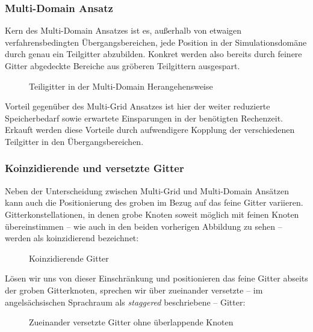 \subsubsection{Multi-Domain Ansatz}

Kern des Multi-Domain Ansatzes ist es, außerhalb von etwaigen verfahrensbedingten Übergangsbereichen, jede Position in der Simulationsdomäne durch genau ein Teilgitter abzubilden. Konkret werden also bereits durch feinere Gitter abgedeckte Bereiche aus gröberen Teilgittern ausgespart.

\begin{figure}[h]
\centering

\caption{Teiligitter in der Multi-Domain Herangehensweise}
\end{figure}

\noindent
Vorteil gegenüber des Multi-Grid Ansatzes ist hier der weiter reduzierte Speicherbedarf sowie erwartete Einsparungen in der benötigten Rechenzeit. Erkauft werden diese Vorteile durch aufwendigere Kopplung \cite[Kap.~3.1]{Lagrava12} der verschiedenen Teilgitter in den Übergangsbereichen.

\subsubsection{Koinzidierende und versetzte Gitter}

Neben der Unterscheidung zwischen Multi-Grid und Multi-Domain Ansätzen kann auch die Positionierung des groben im Bezug auf das feine Gitter variieren. Gitterkonstellationen, in denen grobe Knoten soweit möglich mit feinen Knoten übereinstimmen -- wie auch in den beiden vorherigen Abbildung zu sehen -- werden als koinzidierend bezeichnet:

\begin{figure}[h]
\centering

\caption{Koinzidierende Gitter}
\label{fig:CoincidingGrid}
\end{figure}

\noindent
Lösen wir uns von dieser Einschränkung und positionieren das feine Gitter abseits der groben Gitterknoten, sprechen wir über zueinander versetzte -- im angelsächsischen Sprachraum als \emph{staggered} beschriebene -- Gitter:

\begin{figure}[h]
\centering

\caption{Zueinander versetzte Gitter ohne überlappende Knoten}
\label{fig:StaggeredGrid}
\end{figure}

